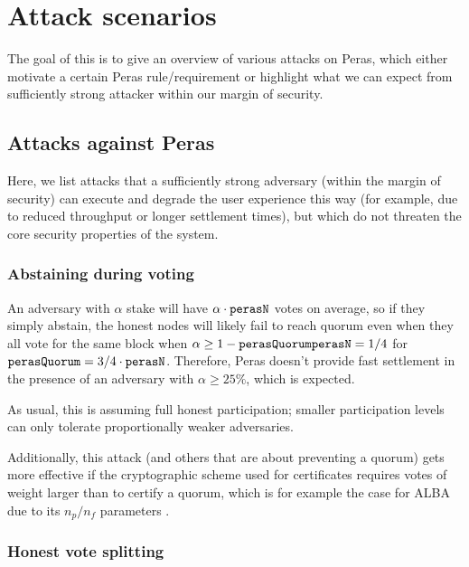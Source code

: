 \chapter{Attack scenarios}\label{chap:attack scenarios}

The goal of this  is to give an overview of various attacks on Peras, which either motivate a certain Peras rule/requirement or highlight what we can expect from sufficiently strong attacker within our margin of security.

\section{Attacks against Peras}

Here, we list attacks that a sufficiently strong adversary (within the margin of security) can execute and degrade the user experience this way (for example, due to reduced throughput or longer settlement times), but which do not threaten the core security properties of the system.

\subsection{Abstaining during voting}\label{sec:abstaining during voting}

An adversary with $\alpha$ stake will have $\alpha\cdot\mathtt{perasN}$ votes on average, so if they simply abstain, the honest nodes will likely fail to reach quorum even when they all vote for the same block when $\alpha \ge 1-\mathtt{perasQuorum}\mathtt{perasN} = 1/4$ for $\mathtt{perasQuorum} = 3/4 \cdot \mathtt{perasN}$.
Therefore, Peras doesn't provide fast settlement in the presence of an adversary with $\alpha\ge 25\%$, which is expected.

As usual, this is assuming full honest participation; smaller participation levels can only tolerate proportionally weaker adversaries.

Additionally, this attack (and others that are about preventing a quorum) gets more effective if the cryptographic scheme used for certificates requires votes of weight larger than \perasQuorum{} to certify a quorum, which is for example the case for ALBA due to its $n_p/n_f$ parameters \parencite{chaidos2024approximate}.

\subsection{Honest vote splitting}\label{sec:honest vote splitting}

